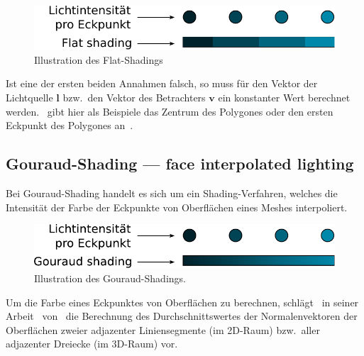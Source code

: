 \begin{figure}[H]
    \centering
    \includegraphics{img/flat_shading.pdf}
    \caption{Illustration des Flat-Shadings\protect\footnotemark}\label{
        fig:flat_shading_illustration}
\end{figure}

Ist eine der ersten beiden Annahmen falsch, so muss für den Vektor der
Lichtquelle $\bm{l}$ bzw.\ den Vektor des Betrachters $\bm{v}$ ein
konstanter Wert berechnet werden.~\citeauthor{foley_computer_1996} gibt
hier als Beispiele das Zentrum des Polygones oder den ersten Eckpunkt
des Polygones an~\parencite[S. 735]{foley_computer_1996}.

\subsection{Gouraud-Shading --- face interpolated lighting}
\label{subsec:gouraud_shading}

Bei Gouraud-Shading handelt es sich um ein Shading-Verfahren, welches
die Intensität der Farbe der Eckpunkte von Oberflächen eines Meshes
interpoliert.

\begin{figure}[H]
    \centering
    \includegraphics{img/gouraud_shading.pdf}
    \caption{Illustration des Gouraud-Shadings\protect\footnotemark.}\label{
        fig:gouraud_shading_illustration}
\end{figure}

Um die Farbe eines Eckpunktes von Oberflächen zu berechnen,
schlägt~\citeauthor{gouraud_continous_1971} in seiner
Arbeit~
von~\citeyear{gouraud_continous_1971} die Berechnung des
Durchschnittswertes der Normalenvektoren der Oberflächen zweier
adjazenter Liniensegmente (im 2D-Raum) bzw.\  aller adjazenter Dreiecke
(im 3D-Raum) vor.

